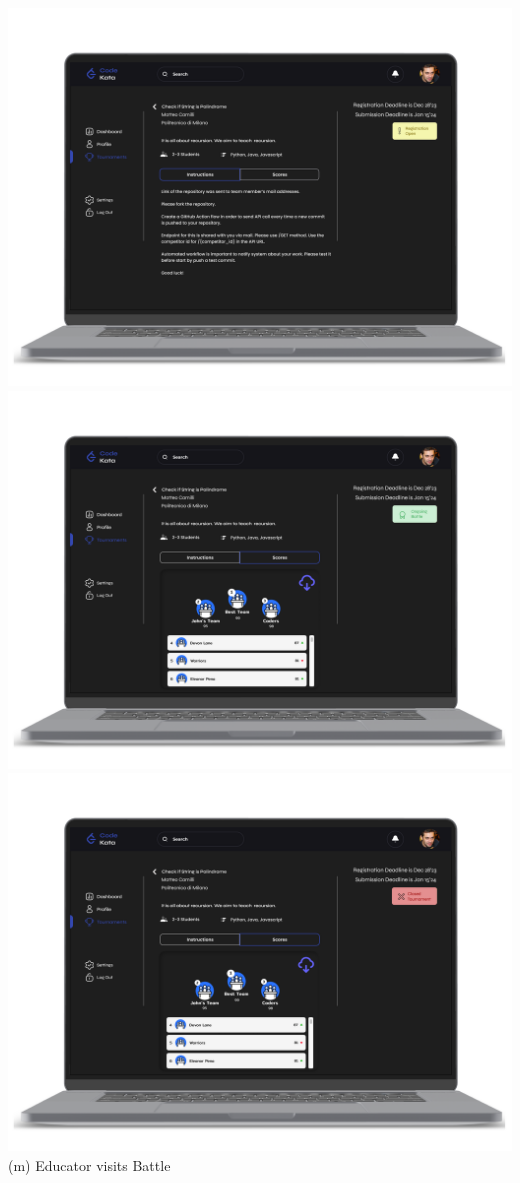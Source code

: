 \newpage
\begin{center}
\includegraphics[scale=0.13]{Images/ui-ux/educator_battle_1.png}
\includegraphics[scale=0.13]{Images/ui-ux/educator_battle_2.png}
\includegraphics[scale=0.13]{Images/ui-ux/educator_battle_3.png}
\\ (m) Educator visits Battle
\end{center}
